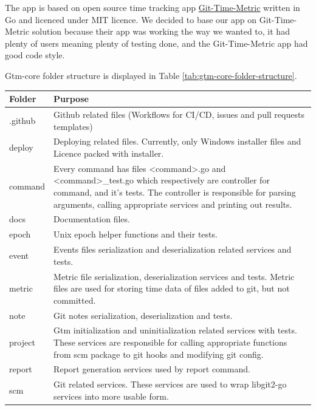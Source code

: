 The app is based on open source time tracking app \href{https://github.com/git-time-metric/gtm}{Git-Time-Metric} written in Go and licenced under MIT licence.
We decided to base our app on Git-Time-Metric solution because their app was working the way we wanted to, it had plenty of users meaning plenty of testing done,
and the Git-Time-Metric app had good code style.

Gtm-core folder structure is displayed in Table
\ref{tab:gtm-core-folder-structure}.

\begin{table}[h]
    \centering
    \begin{tabular}{ | p{3cm} | p{10cm} |}
        \hline
        Folder & Purpose\\
        \hline
        .github & Github related files (Workflows for CI/CD, issues and pull requests templates)\\
        \hline
        deploy & Deploying related files.
        Currently, only Windows installer files and Licence packed with installer.\\
        \hline
        command & Every command has files <command>.go and <command>\_test.go which respectively are controller for command, and it's tests.
        The controller is responsible for parsing arguments, calling appropriate services and printing out results.\\
        \hline
        docs & Documentation files.\\
        \hline
        epoch & Unix epoch helper functions and their tests.\\
        \hline
        event & Events files serialization and deserialization related services and tests.\\
        \hline
        metric & Metric file serialization, deserialization services and tests.
        Metric files are used for storing time data of files added to git, but not committed.\\
        \hline
        note & Git notes serialization, deserialization and tests.\\
        \hline
        project & Gtm initialization and uninitialization related services with tests.
        These services are responsible for calling appropriate functions from scm package to git hooks and modifying git config.\\
        \hline
        report & Report generation services used by report command.\\
        \hline
        scm & Git related services.
        These services are used to wrap libgit2-go services into more usable form.\\

\end{tabular}
\end{table}
